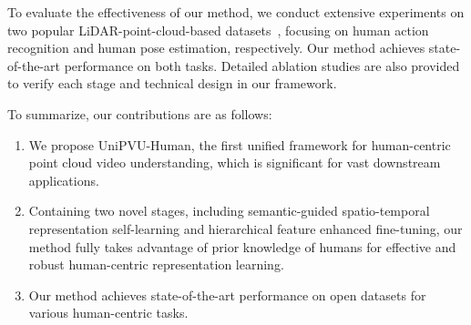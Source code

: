 To evaluate the effectiveness of our method, we conduct extensive experiments on two popular LiDAR-point-cloud-based datasets~\cite{xu2023human,ren2023lidar}, focusing on human action recognition and human pose estimation, respectively. Our method achieves state-of-the-art performance on both tasks. Detailed ablation studies are also provided to verify each stage and technical design in our framework.

To summarize, our contributions are as follows:
\begin{enumerate}
    \item We propose UniPVU-Human, the first unified framework for human-centric point cloud video understanding, which is significant for vast downstream applications.
    \item Containing two novel stages, including semantic-guided spatio-temporal representation self-learning and hierarchical feature enhanced fine-tuning, our method fully takes advantage of prior knowledge of humans for effective and robust human-centric representation learning.
    \item Our method achieves state-of-the-art performance on open datasets for various human-centric tasks.
    
\end{enumerate}


